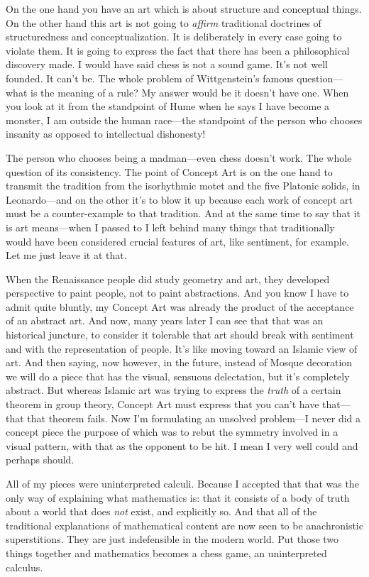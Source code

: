 On the one hand you have an art which is about structure and 
conceptual things. On the other hand this art is not going to \emph{affirm}
traditional doctrines of structuredness and conceptualization. It is 
deliberately in every case going to violate them. It is going to express the 
fact that there has been a philosophical discovery made. I would have 
said chess is not a sound game. It's not well founded. It can't be. The 
whole problem of Wittgenstein's famous question---what is the meaning 
of a rule? My answer would be it doesn't have one. When you look 
at it from the standpoint of Hume when he says I have become a 
monster, I am outside the human race---the standpoint of the person 
who chooses insanity as opposed to intellectual dishonesty! 

The person who chooses being a madman---even chess doesn't 
work. The whole question of its consistency. The point of Concept Art 
is on the one hand to transmit the tradition from the isorhythmic motet 
and the five Platonic solids, in Leonardo---and on the other it's to blow 
it up because each work of concept art must be a counter-example to 
that tradition. And at the same time to say that it is art means---when I 
passed to  I left behind many things that traditionally 
would have been considered crucial features of art, like sentiment, for 
example. Let me just leave it at that. 

When the Renaissance people did study geometry and art, they 
developed perspective to paint people, not to paint abstractions. And 
you know I have to admit quite bluntly, my Concept Art was already 
the product of the acceptance of an abstract art. And now, many years 
later I can see that that was an historical juncture, to consider it 
tolerable that art should break with sentiment and with the representation 
of people. It's like moving toward an Islamic view of art. And then 
saying, now however, in the future, instead of Mosque decoration we 
will do a piece that has the visual, sensuous delectation, but it's completely 
abstract. But whereas Islamic art was trying to express the 
\emph{truth} of a certain theorem in group theory, Concept Art must express 
that you can't have that---that that theorem fails. Now I'm formulating 
an unsolved problem---I never did a concept piece the purpose of which 
was to rebut the symmetry involved in a visual pattern, with that as the 
opponent to be hit. I mean I very well could and perhaps should. 

All of my pieces were uninterpreted calculi. Because I accepted 
that that was the only way of explaining what mathematics is: that it 
consists of a body of truth about a world that does \emph{not} exist, and 
explicitly so. And that all of the traditional explanations of mathematical 
content are now seen to be anachronistic superstitions. They are just 
indefensible in the modern world. Put those two things together and 
mathematics becomes a chess game, an uninterpreted calculus. 

